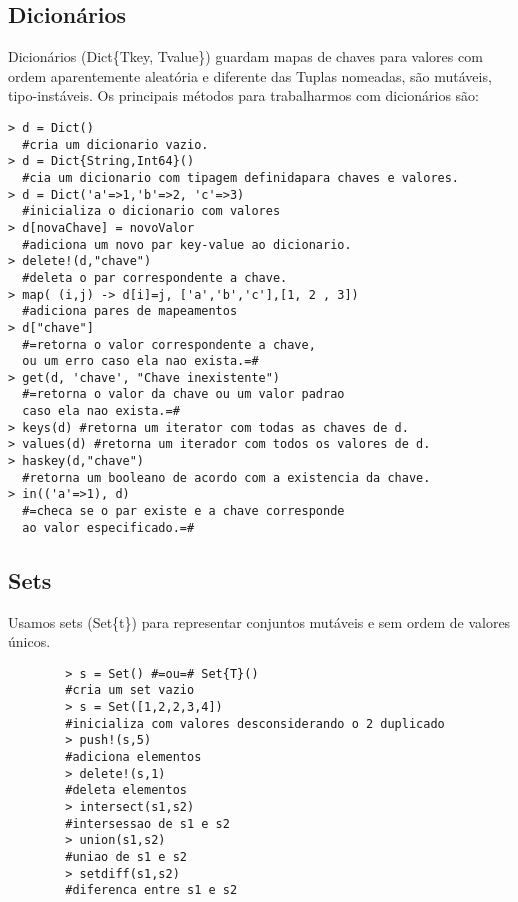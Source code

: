 \subsection{Dicionários}
Dicionários (Dict\{Tkey, Tvalue\}) guardam mapas de chaves para valores com ordem aparentemente aleatória e diferente das Tuplas nomeadas, são mutáveis, tipo-instáveis.
Os principais métodos para trabalharmos com dicionários são:
\begin{lstlisting}
> d = Dict() 
  #cria um dicionario vazio.
> d = Dict{String,Int64}() 
  #cia um dicionario com tipagem definidapara chaves e valores.
> d = Dict('a'=>1,'b'=>2, 'c'=>3) 
  #inicializa o dicionario com valores
> d[novaChave] = novoValor 
  #adiciona um novo par key-value ao dicionario.
> delete!(d,"chave") 
  #deleta o par correspondente a chave.
> map( (i,j) -> d[i]=j, ['a','b','c'],[1, 2 , 3]) 
  #adiciona pares de mapeamentos
> d["chave"] 
  #=retorna o valor correspondente a chave, 
  ou um erro caso ela nao exista.=#
> get(d, 'chave', "Chave inexistente") 
  #=retorna o valor da chave ou um valor padrao 
  caso ela nao exista.=# 
> keys(d) #retorna um iterator com todas as chaves de d.
> values(d) #retorna um iterador com todos os valores de d.
> haskey(d,"chave") 
  #retorna um booleano de acordo com a existencia da chave.
> in(('a'=>1), d) 
  #=checa se o par existe e a chave corresponde 
  ao valor especificado.=#

\end{lstlisting}

\subsection{Sets}
Usamos sets (Set\{t\}) para representar conjuntos mutáveis e sem ordem de valores únicos.
    \begin{lstlisting}
        > s = Set() #=ou=# Set{T}() 
        #cria um set vazio
        > s = Set([1,2,2,3,4]) 
        #inicializa com valores desconsiderando o 2 duplicado
        > push!(s,5) 
        #adiciona elementos
        > delete!(s,1)
        #deleta elementos
        > intersect(s1,s2) 
        #intersessao de s1 e s2
        > union(s1,s2) 
        #uniao de s1 e s2
        > setdiff(s1,s2) 
        #diferenca entre s1 e s2
    \end{lstlisting}

